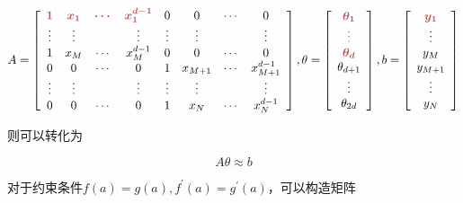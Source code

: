 \begin{notation}
    $$\displaystyle A=\left[\begin{array}{ c c c c c c c c }
        \textcolor[rgb]{0.72,0.33,0.31}{\boldsymbol{1}} & \textcolor[rgb]{0.72,0.33,0.31}{\boldsymbol{x_{1}}} & \textcolor[rgb]{0.72,0.33,0.31}{\boldsymbol{\cdots }} & \textcolor[rgb]{0.72,0.33,0.31}{\boldsymbol{x_{1}^{d-1}}} & 0 & 0 & \cdots  & 0\\
        \vdots  & \vdots  &  & \vdots  & \vdots  & \vdots  &  & \vdots \\
        1 & x_{M} & \cdots  & x_{M}^{d-1} & 0 & 0 & \cdots  & 0\\
        0 & 0 & \cdots  & 0 & 1 & x_{M+1} & \cdots  & x_{M+1}^{d-1}\\
        \vdots  & \vdots  &  & \vdots  & \vdots  & \vdots  &  & \vdots \\
        0 & 0 & \cdots  & 0 & 1 & x_{N} & \cdots  & x_{N}^{d-1}
        \end{array}\right] ,\theta =\left[\begin{array}{ c }
        \textcolor[rgb]{0.72,0.33,0.31}{\boldsymbol{\theta _{1}}}\\
        \textcolor[rgb]{0.72,0.33,0.31}{\boldsymbol{\vdots }}\\
        \textcolor[rgb]{0.72,0.33,0.31}{\boldsymbol{\theta _{d}}}\\
        \theta _{d+1}\\
        \vdots \\
        \theta _{2d}
        \end{array}\right] ,b=\left[\begin{array}{ c }
        \textcolor[rgb]{0.72,0.33,0.31}{\boldsymbol{y_{1}}}\\
        \vdots \\
        y_{M}\\
        y_{M+1}\\
        \vdots \\
        y_{N}
        \end{array}\right]$$
\end{notation}

则可以转化为

$$ A \theta \approx b $$

对于约束条件$f(a)=g(a), f^{\prime}(a)=g^{\prime}(a)$，可以构造矩阵

